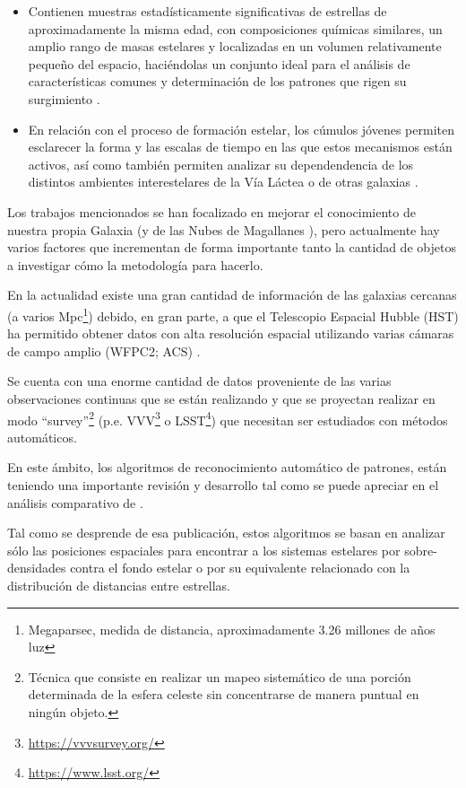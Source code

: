 \documentclass[
	11pt,oneside,a4paper,
	fleqn,
	article
]{memoir}
\begin{document}
\begin{itemize}
	\item Contienen muestras estadísticamente significativas de estrellas de aproximadamente la misma edad, con composiciones químicas similares, un amplio rango de masas estelares y localizadas en un volumen relativamente pequeño del espacio, haciéndolas un conjunto ideal para el análisis de características comunes y determinación de los patrones que rigen su surgimiento  \parencite{Klessen2000}.
	\item En relación con el proceso de formación estelar, los cúmulos jóvenes permiten esclarecer la forma y las escalas de tiempo en las que estos mecanismos están activos, así como también permiten analizar su dependendencia de los distintos ambientes interestelares de la Vía Láctea o de otras galaxias  \parencite{Fall2012}.
\end{itemize}

Los trabajos mencionados se han focalizado en mejorar el conocimiento de nuestra propia Galaxia (y de las Nubes de Magallanes \parencite{Vazquez2008}), pero actualmente hay varios factores que incrementan de forma importante tanto la cantidad de objetos a investigar cómo la metodología para hacerlo.

En la actualidad existe una gran cantidad de información de las galaxias cercanas (a varios Mpc\footnote{Megaparsec, medida de distancia, aproximadamente 3.26 millones de años luz}) debido, en gran parte, a que el Telescopio Espacial Hubble (HST) ha permitido obtener datos con alta resolución espacial utilizando varias cámaras de campo amplio (WFPC2; ACS)  \parencite{Dalcanton2009}.

Se cuenta con una enorme cantidad de datos proveniente de las varias observaciones continuas que se están realizando y que se proyectan realizar en modo “survey”\footnote{Técnica que consiste en realizar un mapeo sistemático de una porción determinada de la esfera celeste sin concentrarse de manera puntual en ningún objeto.} (p.e. VVV\footnote{\url{https://vvvsurvey.org/}} o LSST\footnote{\url{https://www.lsst.org/}}) que necesitan ser estudiados con métodos automáticos. 

En este ámbito, los algoritmos de reconocimiento automático de patrones, están teniendo una importante revisión y desarrollo tal como se puede apreciar en el análisis comparativo de \parencite{Schmeja2011}.

Tal como se desprende de esa publicación, estos algoritmos se basan en analizar sólo las posiciones espaciales para encontrar a los sistemas estelares por sobre-densidades contra el fondo estelar o por su equivalente relacionado con la distribución de distancias entre estrellas.
\end{document}
